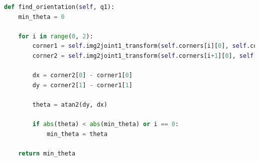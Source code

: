 \begin{lstlisting}[caption=Funktion til at finde orientering på en klods., label=orientation, language=Python]
def find_orientation(self, q1):
    min_theta = 0

    for i in range(0, 2):
        corner1 = self.img2joint1_transform(self.corners[i][0], self.corners[i][1], q1)
        corner2 = self.img2joint1_transform(self.corners[i+1][0], self.corners[i+1][1], q1)

        dx = corner2[0] - corner1[0]
        dy = corner2[1] - corner1[1]

        theta = atan2(dy, dx)

        if abs(theta) < abs(min_theta) or i == 0:
            min_theta = theta

    return min_theta
\end{lstlisting}
